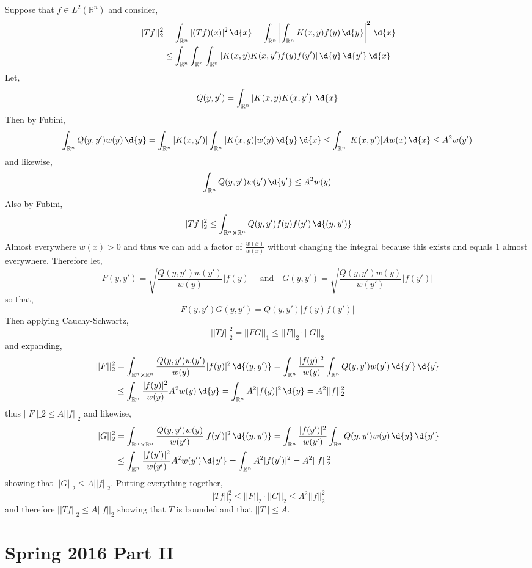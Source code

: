 \documentclass[12pt]{article}
\newcommand{\R}{\mathbb{R}}
\begin{document}
Suppose that $f \in L^2(\R^n)$ and consider,
\begin{align*}
|| T f ||_2^2 & = \int_{\R^n} |(T f)(x)|^2 \, \d{x} = \int_{\R^n} \left| \int_{\R^n} K(x, y) f(y) \, \d{y} \right|^2 \, \d{x}
\\
& \le \int_{\R^n} \int_{\R^n} \int_{\R^n} |K(x,y) K(x, y') f(y) f(y')| \, \d{y} \, \d{y'} \, \d{x} 
\end{align*}
Let,
\[ Q(y, y') = \int_{\R^n} |K(x,y) K(x,y')| \, \d{x} \]
Then by Fubini,
\[ \int_{\R^n} Q(y, y') w(y) \, \d{y} = \int_{\R^n} |K(x,y') | \int_{\R^n} | K(x,y) | w(y) \, \d{y} \, \d{x} \le \int_{\R^n} |K(x, y')| A w(x) \, \d{x} \le A^2 w(y') \]
and likewise,
\[ \int_{\R^n} Q(y, y') w(y') \, \d{y'} \le A^2 w(y) \]
Also by Fubini,
\[ || T f ||_2^2 \le \int_{\R^n \times \R^n} Q(y, y') f(y) f(y') \, \d{(y, y')} \]
Almost everywhere $w(x) > 0$ and thus we can add a factor of $\frac{w(x)}{w(x)}$ without changing the integral because this exists and equals 1 almost everywhere. Therefore let,
\[ F(y, y') = \sqrt{ \frac{Q(y, y') w(y') }{w(y)}} |f(y)| \quad \text{and} \quad G(y,y') = \sqrt{\frac{Q(y, y') w(y)}{w(y')}} |f(y')| \]
so that,
\[ F(y, y') G(y, y') = Q(y,y') |f(y) f(y')| \]
Then applying Cauchy-Schwartz,
\[ || T f ||_2^2 = || F G ||_{1} \le || F ||_2 \cdot || G ||_2 \]
and expanding,
\begin{align*}
|| F ||_2^2 & = \int_{\R^n \times \R^n} \frac{Q(y, y') w(y') }{w(y)} |f(y)|^2 \, \d{(y, y')} = \int_{\R^n} \frac{| f(y) |^2}{w(y)} \int_{\R^n} Q(y, y') w(y') \, \d{y'} \, \d{y}
\\
& \le \int_{\R^n} \frac{|f(y)|^2}{w(y)} A^2 w(y) \, \d{y} = \int_{\R^n} A^2 | f(y) |^2 \, \d{y} = A^2 || f ||_2^2 
\end{align*}
thus $|| F ||\_2 \le A || f ||_2$ and likewise,
\begin{align*}
|| G ||_2^2 & = \int_{\R^n \times \R^n} \frac{Q(y, y') w(y) }{w(y')} |f(y')|^2 \, \d{(y, y')} = \int_{\R^n} \frac{| f(y') |^2}{w(y')} \int_{\R^n} Q(y, y') w(y) \, \d{y} \, \d{y'}
\\
& \le \int_{\R^n} \frac{|f(y')|^2}{w(y')} A^2 w(y') \, \d{y'} = \int_{\R^n} A^2 | f(y') |^2 = A^2 || f ||_2^2 
\end{align*}
showing that $||G ||_2 \le A || f ||_2$. Putting everything together,
\[ || T f ||_2^2 \le || F ||_2 \cdot || G ||_2 \le A^2 || f ||_2^2 \]
and therefore $|| T f ||_2 \le A || f ||_2$ showing that $T$ is bounded and that $|| T || \le A$.

\section{Spring 2016 Part II}
\end{document}
